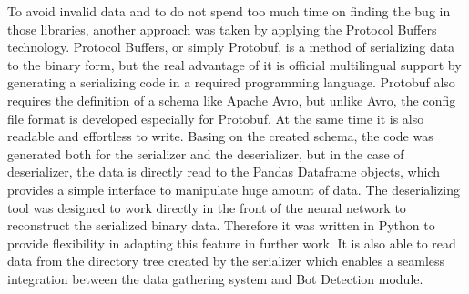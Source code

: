 To avoid invalid data and to do not spend too much time on finding the bug in those libraries, another approach was taken by applying the Protocol Buffers technology.
Protocol Buffers, or simply Protobuf, is a method of serializing data to the binary form, but the real advantage of it is official multilingual support by generating a serializing code in a required programming language.
Protobuf also requires the definition of a schema like Apache Avro, but unlike Avro, the config file format is developed especially for Protobuf.
At the same time it is also readable and effortless to write.
Basing on the created schema, the code was generated both for the serializer and the deserializer, but in the case of deserializer, the data is directly read to the Pandas Dataframe objects, which provides a simple interface to manipulate huge amount of data.
The deserializing tool was designed to work directly in the front of the neural network to reconstruct the serialized binary data.
Therefore it was written in Python to provide flexibility in adapting this feature in further work.
It is also able to read data from the directory tree created by the serializer which enables a seamless integration between the data gathering system and Bot Detection module.